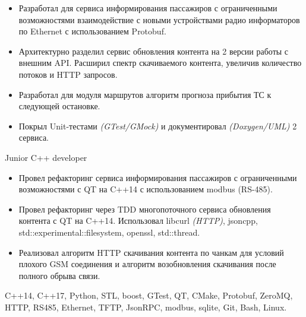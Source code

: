 {    \smallskip
    \begin{itemize}

        \item
            Разработал для сервиса информирования пассажиров с ограниченными возможностями
            взаимодействие с новыми устройствами радио информаторов по Ethernet с использованием
            Protobuf.

        \item
            Архитектурно разделил сервис обновления контента на 2 версии работы с внешним API.
            Расширил спектр скачиваемого контента, увеличив количество потоков и HTTP запросов.

        \item
            Разработал для модуля маршрутов алгоритм прогноза прибытия ТС к следующей остановке.

        \item
            Покрыл Unit-тестами \textit{(GTest/GMock)} и документировал \textit{(Doxygen/UML)}
            2 сервиса.

    \end{itemize}


    \cvexperiencePosition
        {Junior C++ developer}

    \cvexperiencePeriod
        {}

    \smallskip
    \begin{itemize}

        \item
            Провел рефакторинг сервиса информирования пассажиров с ограниченными возможностями
            с QT на C++14 с использованием modbus (RS-485).

        \item
            Провел рефакторинг через TDD многопоточного сервиса обновления контента с QT на C++14.
            Использовал libcurl \textit{(HTTP)}, jsoncpp, std::experimental::filesystem, openssl,
            std::thread.

        \item
            Реализовал алгоритм HTTP скачивания контента по чанкам для условий плохого GSM
            соединения и алгоритм возобновления скачивания после полного обрыва связи.

    \end{itemize}


    \funcExperienceTechnology
    {
        C++14, C++17, Python,                                           %
        STL, boost, GTest, QT,                                          %
        CMake,                                                          %
        Protobuf, ZeroMQ, HTTP, RS485, Ethernet, TFTP, JsonRPC, modbus, %
        sqlite,
        Git,                                                            %
        Bash, Linux.                                                    %
    }
}


